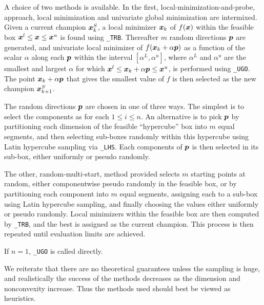 \documentclass{galahad}
\begin{document}
\galmethod
A choice of two methods is available. 
In the first, local-minimization-and-probe, approach, local minimization
and univariate global minimization are intermixed. Given a current 
champion ${\bm{x}}^S_k$, a local minimizer ${\bm{x}}_k$ of $f({\bm{x}})$ within the
feasible box ${\bm{x}}^l \leq {\bm{x}} \leq {\bm{x}}^u$ is found using 
{\tt \libraryname\_TRB}.
Thereafter $m$ random directions ${\bm{p}}$ are generated, and univariate
local minimizer of $f({\bm{x}}_k + \alpha {\bm{p}})$ as a function of the scalar
$\alpha$ along each ${\bm{p}}$ within the interval $[\alpha^L,\alpha^u]$,
where $\alpha^L$ and $\alpha^u$ are the smallest and largest $\alpha$ 
for which ${\bm{x}}^l \leq {\bm{x}}_k + \alpha {\bm{p}} \leq {\bm{x}}^u$, 
is performed using {\tt \libraryname\_UGO}. The point ${\bm{x}}_k + \alpha {\bm{p}}$
that gives the smallest value of $f$ is then selected as the new champion
${\bm{x}}^S_{k+1}$.

The random directions ${\bm{p}}$ are chosen in one of three ways. The simplest is
to select the components as
for each $1 \leq i \leq n$. An alternative is to 
pick ${\bm{p}}$ by partitioning each dimension of the feasible ``hypercube'' box 
into $m$ equal segments, and then selecting sub-boxes
randomly within this hypercube using Latin hypercube sampling via
{\tt \libraryname\_LHS}.
Each components of ${\bm{p}}$ is then selected in its sub-box, either uniformly
or pseudo randomly.

The other, random-multi-start, method provided selects $m$ starting points 
at random, either componentwise pseudo randomly in the feasible box, 
or by partitioning each component into $m$ equal segments, assigning each to
a sub-box using Latin hypercube sampling, and finally choosing the
values either uniformly or pseudo randomly. Local minimizers within the
feasible box are then computed by {\tt \libraryname\_TRB}, and
the best is assigned as the current champion. This process is then
repeated until evaluation limits are achieved.

If $n=1$, {\tt \libraryname\_UGO} is called directly.

We reiterate that there are no theoretical guarantees unless the sampling 
is huge, and realistically the success of the methods decreases as the 
dimension and nonconvexity increase. Thus the methods used should best
be viewed as heuristics.
\end{document}
